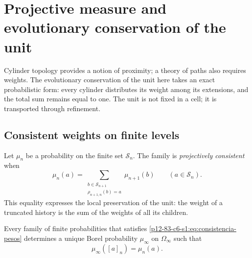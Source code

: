 \label{chap:83-06}

\section{Projective measure and evolutionary conservation of the unit}
\label{p12-83-c6-s1:chap:medida-proyectiva}

Cylinder topology provides a notion of proximity; a theory of paths also requires weights. The evolutionary conservation of the unit here takes an exact probabilistic form: every cylinder distributes its weight among its extensions, and the total sum remains equal to one. The unit is not fixed in a cell; it is transported through refinement.

\subsection{Consistent weights on finite levels}

Let \(\mu_n\) be a probability on the finite set
\(\mathcal S_n\). The family is \emph{projectively consistent} when
\begin{equation}
 \mu_n(a)
 =\sum_{\substack{b\in\mathcal S_{n+1}\\
                   \rho_{n+1,n}(b)=a}}
   \mu_{n+1}(b)
 \qquad(a\in\mathcal S_n).
 \label{p12-83-c6-s1:eq:consistencia-pesos}
\end{equation}
This equality expresses the local preservation of the unit: the weight of a
truncated history is the sum of the weights of all its children.

\begin{theorem}
\label{p12-83-c6-s1:thm:medida-genealogica}
Every family of finite probabilities that satisfies
\eqref{p12-83-c6-s1:eq:consistencia-pesos} determines a unique Borel probability
\(\mu_\infty\) on \(\Omega_\infty\) such that
\begin{equation}
 \mu_\infty([a]_n)=\mu_n(a).
 \label{p12-83-c6-s1:eq:medida-cilindro}
\end{equation}
\end{theorem}

